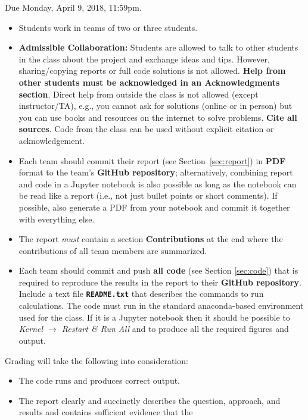\documentclass[letterpaper]{scrartcl}
\begin{document}
\begin{framed}
  \noindent
  Due Monday, April 9, 2018, 11:59pm.
  \begin{itemize}
  \item Students work in teams of two or three students.
  \item \textbf{Admissible Collaboration:} Students are allowed to
    talk to other students in the class about the project and exchange
    ideas and tips. However, sharing/copying reports or full code
    solutions is not allowed. \textbf{Help from other students must be
      acknowledged in an Acknowledgments section}.  Direct help from
    outside the class is not allowed (except instructor/TA), e.g., you
    cannot ask for solutions (online or in person) but you can use
    books and resources on the internet to solve
    problems. \textbf{Cite all sources}. Code from the class can be
    used without explicit citation or acknowledgement.
  \item Each team should commit their  report (see
    Section~\ref{sec:report}) in \textbf{PDF} format to the team's
    \textbf{GitHub repository}; alternatively, combining report and
    code in a Jupyter notebook is also possible as long as the
    notebook can be read like a report (i.e., not just bullet points
    or short comments). If possible, also generate a PDF from your
    notebook and commit it together with everything else.
  \item The report \emph{must} contain a section
    \textbf{Contributions} at the end where the contributions of all
    team members are summarized. 
  \item Each team should commit and push \textbf{all code} (see
    Section \ref{sec:code}) that is required to reproduce the results
    in the report to their \textbf{GitHub repository}. Include a
    text file \textbf{\texttt{README.txt}} that describes the commands
    to run calculations. The code must run in the standard
    anaconda-based environment used for the class. If it is a Jupyter
    notebook then it should be possible to \emph{Kernel $\rightarrow$
      Restart \& Run All} and to produce all the required figures and
    output.
  \end{itemize}
  Grading will take the following into consideration:
  \begin{itemize}
  \item The code runs and produces correct output.
  \item The report clearly and succinctly describes the question,
    approach, and results and contains sufficient evidence that the

\end{itemize}
\end{framed}
\end{document}
